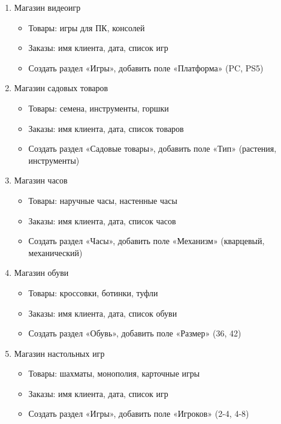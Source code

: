 \documentclass[12pt]{article}
\numberwithin{listing}{section}
\numberwithin{figure}{section}
\begin{document}
\begin{enumerate}
	\item Магазин видеоигр
	      \begin{itemize}
		      \item Товары: игры для ПК, консолей
		      \item Заказы: имя клиента, дата, список игр
		      \item Создать раздел «Игры», добавить поле «Платформа» (PC, PS5)
	      \end{itemize}

	\item Магазин садовых товаров
	      \begin{itemize}
		      \item Товары: семена, инструменты, горшки
		      \item Заказы: имя клиента, дата, список товаров
		      \item Создать раздел «Садовые товары», добавить поле «Тип» (растения, инструменты)
	      \end{itemize}

	\item Магазин часов
	      \begin{itemize}
		      \item Товары: наручные часы, настенные часы
		      \item Заказы: имя клиента, дата, список часов
		      \item Создать раздел «Часы», добавить поле «Механизм» (кварцевый, механический)
	      \end{itemize}

	\item Магазин обуви
	      \begin{itemize}
		      \item Товары: кроссовки, ботинки, туфли
		      \item Заказы: имя клиента, дата, список обуви
		      \item Создать раздел «Обувь», добавить поле «Размер» (36, 42)
	      \end{itemize}

	\item Магазин настольных игр
	      \begin{itemize}
		      \item Товары: шахматы, монополия, карточные игры
		      \item Заказы: имя клиента, дата, список игр
		      \item Создать раздел «Игры», добавить поле «Игроков» (2-4, 4-8)
	      \end{itemize}


\end{enumerate}
\end{document}
